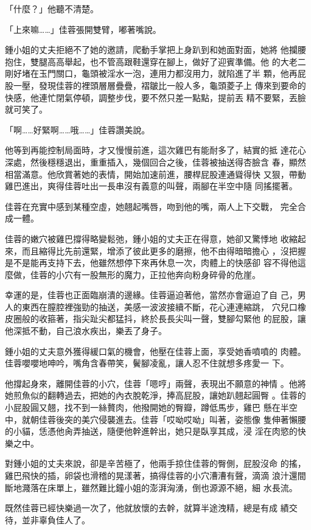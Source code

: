 「什麼？」他聽不清楚。

「上來嘛……」佳蓉張開雙臂，嘟著嘴說。

鍾小姐的丈夫拒絕不了她的邀請，爬動手掌把上身趴到和她面對面，她將
他攔腰抱住，雙腿高高舉起，也不管高跟鞋還穿在腳上，做好了迎賓準備。他
的大老二剛好堵在玉門關口，龜頭被淫水一泡，連用力都沒用力，就陷進了半
顆，他再屁股一壓，發現佳蓉的裡頭層層疊疊，褶皺比一般人多，龜頭菱子上
傳來到要命的快感，他連忙閉氣停頓，調整步伐，要不然只差一點點，提前丟
精不要緊，丟臉就可笑了。

「啊……好緊啊……哦……」佳蓉讚美說。

他等到再能控制局面時，才又慢慢前進，這次雞巴有能耐多了，結實的抵
達花心深處，然後穩穩退出，重重插入，幾個回合之後，佳蓉被抽送得杏臉含
春，顯然相當滿意。他欣賞著她的表情，開始加速前進，腰桿屁股連通聳得快
又狠，帶動雞巴進出，爽得佳蓉吐出一長串沒有義意的叫聲，兩腳在半空中隨
同搖擺著。

佳蓉在充實中感到某種空虛，她翹起嘴唇，吻到他的嘴，兩人上下交戰，
完全合成一體。

佳蓉的嫩穴被雞巴撐得略變鬆弛，鍾小姐的丈夫正在得意，她卻又驚悸地
收縮起來，而且縮得比先前還緊，增添了彼此更多的磨擦，他不由得暗暗擔心
，沒把握是不是能再支持下去，他雖然想停下來再休息一次，肉體上的快感卻
容不得他這麼做，佳蓉的小穴有一股無形的魔力，正拉他奔向粉身碎骨的危崖。

幸運的是，佳蓉也正面臨崩潰的邊緣。佳蓉逼迫著他，當然亦會逼迫了自
己，男人的東西在膣腔裡強勁的抽送，美感一波波接續不斷，花心連連縮跳，
穴兒口橡皮圈般的收箍著，指尖趾尖都猛抖，終於長長尖叫一聲，雙腳勾緊他
的屁股，讓他深抵不動，自己浪水疾出，樂丟了身子。

鍾小姐的丈夫意外獲得緩口氣的機會，他壓在佳蓉上面，享受她香噴噴的
肉體。佳蓉嚶嚶地呻吟，嘴角含春帶笑，鬢腳凌亂，讓人忍不住就想多疼愛一
下。

他撐起身來，離開佳蓉的小穴，佳蓉「嗯哼」兩聲，表現出不願意的神情
。他將她煎魚似的翻轉過去，把她的內衣脫乾淨，捧高屁股，讓她趴翹起圓臀
。佳蓉的小屁股圓又翹，找不到一絲贅肉，他撥開她的臀瓣，蹲低馬步，雞巴
懸在半空中，就朝佳蓉後突的美穴侵襲進去。佳蓉「哎呦哎呦」叫著，姿態像
隻伸著懶腰的小貓，恁憑他肏弄抽送，隨便他幹進幹出，她只是臥享其成，浸
淫在肉慾的快樂之中。

對鍾小姐的丈夫來說，卻是辛苦極了，他兩手掠住佳蓉的臀側，屁股沒命
的搖，雞巴飛快的插，卵袋也滑稽的晃漾著，搞得佳蓉的小穴漕漕有聲，滴滴
浪汁還間斷地濺落在床單上，雖然難比鐘小姐的澎湃洶湧，倒也源源不絕，細
水長流。

既然佳蓉已經快樂過一次了，他就放懷的去幹，就算半途洩精，總是有成
績交待，並非辜負佳人了。


